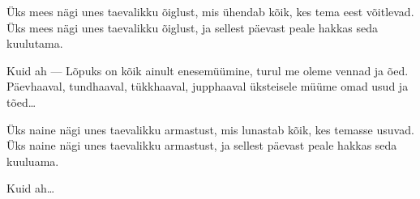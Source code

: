 \"Uks mees n\"agi unes taevalikku \~oiglust,
mis \"uhendab k\~oik, kes tema eest v\~oitlevad.
\"Uks mees n\"agi unes taevalikku \~oiglust,
ja sellest p\"aevast peale hakkas seda kuulutama.

Kuid ah ---
L\~opuks on k\~oik ainult enesem\"u\"umine,
turul me oleme vennad ja \~oed.
P\"aevhaaval, tundhaaval,
t\"ukkhaaval, jupphaaval
\"uksteisele m\"u\"ume
omad usud ja t\~oed\ldots

\"Uks naine n\"agi unes taevalikku armastust,
mis lunastab k\~oik, kes temasse usuvad.
\"Uks naine n\"agi unes taevalikku armastust,
ja sellest p\"aevast peale hakkas seda kuuluama.

Kuid ah\ldots
